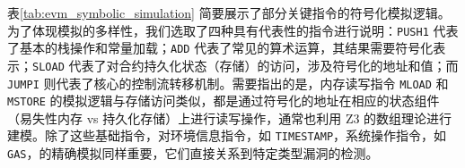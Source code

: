 \documentclass[print, master, vlined, timesmath]{DissertUESTC}
\begin{document}
表\ref{tab:evm_symbolic_simulation} 简要展示了部分关键指令的符号化模拟逻辑。为了体现模拟的多样性，我们选取了四种具有代表性的指令进行说明：\texttt{PUSH1} 代表了基本的栈操作和常量加载；\texttt{ADD} 代表了常见的算术运算，其结果需要符号化表示；\texttt{SLOAD} 代表了对合约持久化状态（存储）的访问，涉及符号化的地址和值；而 \texttt{JUMPI} 则代表了核心的控制流转移机制。需要指出的是，内存读写指令 \texttt{MLOAD} 和 \texttt{MSTORE} 的模拟逻辑与存储访问类似，都是通过符号化的地址在相应的状态组件（易失性内存 vs 持久化存储）上进行读写操作，通常也利用 Z3 的数组理论进行建模。除了这些基础指令，对环境信息指令，如 \texttt{TIMESTAMP}，系统操作指令，如 \texttt{GAS}，的精确模拟同样重要，它们直接关系到特定类型漏洞的检测。

\end{document}
